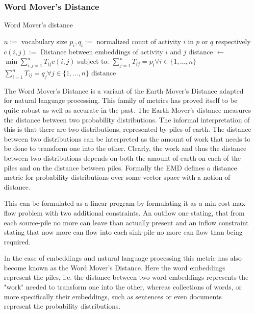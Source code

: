 \documentclass[runningheads]{template/llncs}
\begin{document}
\subsubsection{Word Mover's Distance}

\color{blue}
\begin{algorithm}
	\caption{Word Mover's distance}\label{alg:wmd}
	\begin{algorithmic}
		\State $n:=$ vocabulary size
		\State $p_i,q_i := $ normalized count of activity $i$ in $p$ or $q$ respectively
		\State $c(i,j) :=$ Distance between embeddings of activity $i$ and $j$
		\State distance $\gets$ $\min \sum_{i,j=1}^n T_{ij}c(i,j)$
		\State subject to:
		\State $\sum_{j=1}^{n}T_{ij}=p_i \forall i \in \{1,...,n\}$ 
		\State $\sum_{i=1}^{n}T_{ij}=q_j \forall j \in \{1,...,n\}$ 
		\State \Return distance
		\EndFunction
	\end{algorithmic}
\end{algorithm}
The Word Mover's Distance \cite{KSKW15} is a variant of the Earth Mover's Distance \cite{RTGu98} adapted for natural language processing.
This family of metrics has proved itself to be quite robust as well as accurate in the past.
The Earth Mover's distance measures the distance between two probability distributions.
The informal interpretation of this is that there are two distributions, represented by piles of earth.
The distance between two distributions can be interpreted as the amount of work that needs to be done to transform one into the other.
Clearly, the work and thus the distance between two distributions depends on both the amount of earth on each of the piles and on the distance between piles.
Formally the EMD defines a distance metric for probability distributions over some vector space with a notion of distance.

This can be formulated as a linear program by formulating it as a min-cost-max-flow problem with two additional constraints. An outflow one stating, that from each source-pile no more can leave than actually present and an inflow constraint stating that now more can flow into each sink-pile no more can flow than being required.

In the case of embeddings and natural language processing this metric has also become known as the Word Mover's Distance.
Here the word embeddings represent the piles, i.e. the distance between two-word embeddings represents the "work" needed to transform one into the other, whereas collections of words, or more specifically their embeddings, such as sentences or even documents represent the probability distributions.
\end{document}
